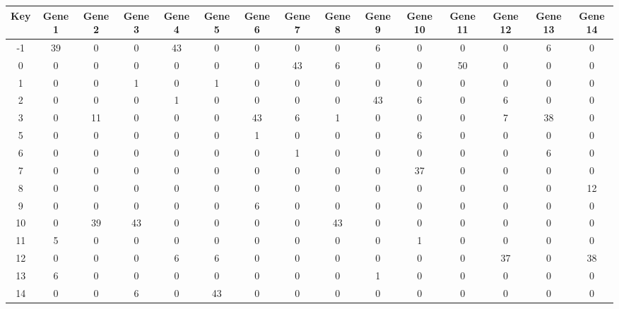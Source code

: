 \begin{tabular}{|c|c|c|c|c|c|c|c|c|c|c|c|c|c|c|}
\hline
Key & Gene 1 & Gene 2 & Gene 3 & Gene 4 & Gene 5 & Gene 6 & Gene 7 & Gene 8 & Gene 9 & Gene 10 & Gene 11 & Gene 12 & Gene 13 & Gene 14 \\
\hline
-1 & 39 & 0 & 0 & 43 & 0 & 0 & 0 & 0 & 6 & 0 & 0 & 0 & 6 & 0 \\
0 & 0 & 0 & 0 & 0 & 0 & 0 & 43 & 6 & 0 & 0 & 50 & 0 & 0 & 0 \\
1 & 0 & 0 & 1 & 0 & 1 & 0 & 0 & 0 & 0 & 0 & 0 & 0 & 0 & 0 \\
2 & 0 & 0 & 0 & 1 & 0 & 0 & 0 & 0 & 43 & 6 & 0 & 6 & 0 & 0 \\
3 & 0 & 11 & 0 & 0 & 0 & 43 & 6 & 1 & 0 & 0 & 0 & 7 & 38 & 0 \\
5 & 0 & 0 & 0 & 0 & 0 & 1 & 0 & 0 & 0 & 6 & 0 & 0 & 0 & 0 \\
6 & 0 & 0 & 0 & 0 & 0 & 0 & 1 & 0 & 0 & 0 & 0 & 0 & 6 & 0 \\
7 & 0 & 0 & 0 & 0 & 0 & 0 & 0 & 0 & 0 & 37 & 0 & 0 & 0 & 0 \\
8 & 0 & 0 & 0 & 0 & 0 & 0 & 0 & 0 & 0 & 0 & 0 & 0 & 0 & 12 \\
9 & 0 & 0 & 0 & 0 & 0 & 6 & 0 & 0 & 0 & 0 & 0 & 0 & 0 & 0 \\
10 & 0 & 39 & 43 & 0 & 0 & 0 & 0 & 43 & 0 & 0 & 0 & 0 & 0 & 0 \\
11 & 5 & 0 & 0 & 0 & 0 & 0 & 0 & 0 & 0 & 1 & 0 & 0 & 0 & 0 \\
12 & 0 & 0 & 0 & 6 & 6 & 0 & 0 & 0 & 0 & 0 & 0 & 37 & 0 & 38 \\
13 & 6 & 0 & 0 & 0 & 0 & 0 & 0 & 0 & 1 & 0 & 0 & 0 & 0 & 0 \\
14 & 0 & 0 & 6 & 0 & 43 & 0 & 0 & 0 & 0 & 0 & 0 & 0 & 0 & 0 \\
\hline
\end{tabular}